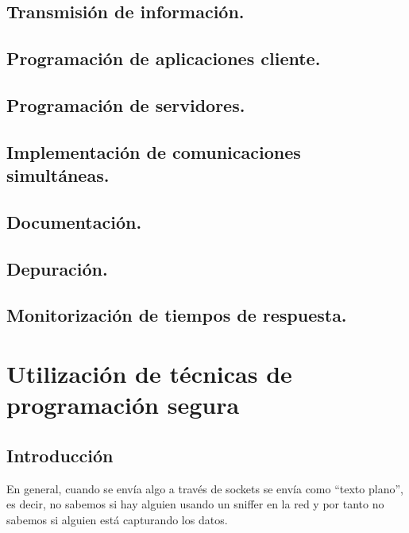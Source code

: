 \documentclass[a4paper,12pt,spanish]{sphinxmanual}
\begin{document}
\section{Transmisión de información.}
\label{textos/tema4:transmision-de-informacion}

\section{Programación de aplicaciones cliente.}
\label{textos/tema4:programacion-de-aplicaciones-cliente}

\section{Programación de servidores.}
\label{textos/tema4:programacion-de-servidores}

\section{Implementación de comunicaciones simultáneas.}
\label{textos/tema4:implementacion-de-comunicaciones-simultaneas}

\section{Documentación.}
\label{textos/tema4:documentacion}

\section{Depuración.}
\label{textos/tema4:depuracion}

\section{Monitorización de tiempos de respuesta.}
\label{textos/tema4:monitorizacion-de-tiempos-de-respuesta}

\chapter{{}Utilización de técnicas de programación segura}
\label{textos/tema5:utilizacion-de-tecnicas-de-programacion-segura}\label{textos/tema5::doc}

\section{Introducción}
\label{textos/tema5:introduccion}
En general, cuando se envía algo a través de sockets se envía como ``texto plano'', es decir, no sabemos si hay alguien usando un sniffer en la red y por tanto no sabemos si alguien está capturando los datos.
\end{document}
